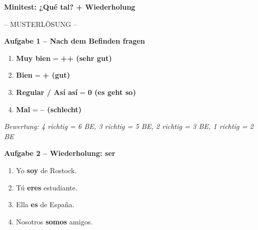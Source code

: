 \documentclass[11pt, a4paper]{article}
\newcommand{\punktebox}[1]{\hfill\fbox{\small \_\_\_/#1}}
\newcommand{\es}[1]{\textcolor{spanisch}{\textbf{#1}}}
\newcommand{\lsg}[1]{\textcolor{loesung}{\textbf{#1}}}
\begin{document}

\begin{center}
    {\Large\bfseries\textcolor{spanisch}{Minitest: ¿Qué tal? + Wiederholung}}

    \vspace{5pt}
    {\large\textcolor{loesung}{-- MUSTERLÖSUNG --}}
\end{center}

\vspace{10pt}


\noindent\textbf{\textcolor{spanisch}{Aufgabe 1 -- Nach dem Befinden fragen}} \punktebox{6}

\vspace{10pt}

\begin{enumerate}[label=\arabic*.]
    \item \es{Muy bien} = \lsg{++ (sehr gut)}
    \item \es{Bien} = \lsg{+ (gut)}
    \item \es{Regular / Así así} = \lsg{0 (es geht so)}
    \item \es{Mal} = \lsg{-- (schlecht)}
\end{enumerate}

\vspace{5pt}
\textit{Bewertung: 4 richtig = 6 BE, 3 richtig = 5 BE, 2 richtig = 3 BE, 1 richtig = 2 BE}

\vspace{15pt}


\noindent\textbf{\textcolor{spanisch}{Aufgabe 2 -- Wiederholung: ser}} \punktebox{6}

\vspace{10pt}

\begin{enumerate}[label=\alph*)]
    \item Yo \lsg{soy} de Rostock.
    \item Tú \lsg{eres} estudiante.
    \item Ella \lsg{es} de España.
    \item Nosotros \lsg{somos} amigos.
\end{enumerate}
\end{document}

